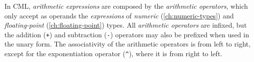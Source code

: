In CML, \emph{arithmetic expressions} are composed by
the \emph{arithmetic operators},
which only accept as operands
the \emph{expressions} of \emph{numeric} (\ref{ch:numeric-types})
and \emph{floating-point} (\ref{ch:floating-point}) types.
All \emph{arithmetic operators} are infixed,
but the addition (\verb|+|) and subtraction (\verb|-|) operators may also be prefixed when used in the unary form.
The associativity of the arithmetic operators is from left to right,
except for the exponentiation operator (\verb|^|),
where it is from right to left.
